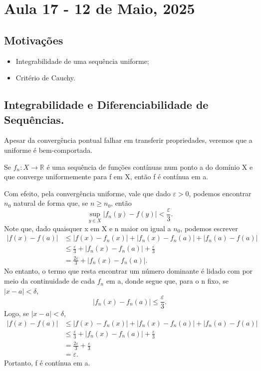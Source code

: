 \documentclass[../analysisII_notes.tex]{subfiles}
\begin{document}
\section{Aula 17 - 12 de Maio, 2025}
\subsection{Motivações}
\begin{itemize}
	\item Integrabilidade de uma sequência uniforme;
	\item Critério de Cauchy.
\end{itemize}
\subsection{Integrabilidade e Diferenciabilidade de Sequências.}
Apesar da convergência pontual falhar em transferir propriedades, veremos que a uniforme é bem-comportada.
\begin{theorem*}
	Se \(f_{n}:X\rightarrow \mathbb{R}\) é uma sequência de funções contínuas num ponto a do domínio X e que converge uniformemente para f em X, então f é contínua em a.
\end{theorem*}
\begin{proof*}
	Com efeito, pela convergência uniforme, vale que dado \(\varepsilon >0\), podemos encontrar \(n_{0}\) natural de forma que, se \(n\geq n_{0}\), então
	\[
		\sup_{y\in X}|f_{n}(y)-f(y)|<\frac{\varepsilon }{3}.
	\]
	Note que, dado quaisquer x em X e n maior ou igual a \(n_{0}\), podemos escrever
	\begin{align*}
		|f(x)-f(a)| & \leq |f(x)-f_{n}(x)|+|f_{n}(x)-f_{n}(a)|+|f_{n}(a)-f(a)|                     \\
		            & \leq \frac{\varepsilon }{3} + |f_{n}(x) - f_{n}(a)| + \frac{\varepsilon }{3} \\
		            & = \frac{2\varepsilon }{3}+|f_{n}(x)-f_{n}(a)|.
	\end{align*}
	No entanto, o termo que resta encontrar um número dominante é lidado com por meio da continuidade de cada \(f_{n}\) em a, donde segue que, para o n fixo, se \(|x-a| < \delta \),
	\[
		|f_{n}(x)-f_{n}(a)| \leq \frac{\varepsilon }{3}.
	\]
	Logo, se \(|x-a|<\delta \),
	\begin{align*}
		|f(x)-f(a)| & \leq |f(x)-f_{n}(x)|+|f_{n}(x)-f_{n}(a)|+|f_{n}(a)-f(a)|                     \\
		            & \leq \frac{\varepsilon }{3} + |f_{n}(x) - f_{n}(a)| + \frac{\varepsilon }{3} \\
		            & = \frac{2\varepsilon }{3}+ \frac{\varepsilon }{3}                            \\
		            & = \varepsilon.
	\end{align*}
	Portanto, f é contínua em a. \qedsymbol
\end{proof*}
\end{document}
